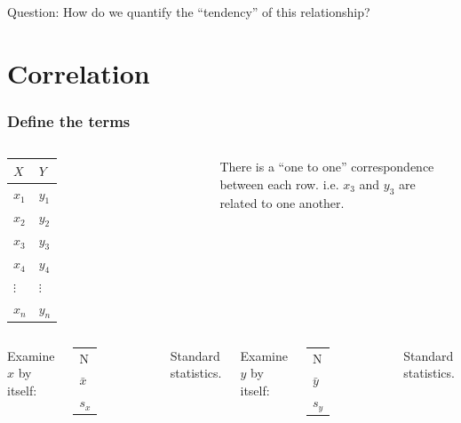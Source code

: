 \begin{frame}
  Question: How do we quantify the ``tendency'' of this relationship?
\end{frame}


\section{Correlation}


\begin{frame}
  \frametitle{Define the terms}

  \begin{columns}

    \begin{tabular}{l|l}
      $X$ & $Y$ \\ \hline
      $x_1$ & $y_1$ \\
      $x_2$ & $y_2$ \\
      $x_3$ & $y_3$ \\
      $x_4$ & $y_4$ \\
      $\vdots$ & $\vdots$ \\
      $x_n$ & $y_n$ \\
    \end{tabular}


    \vfill


    {
      There is a ``one to one'' correspondence between each
      row. i.e. $x_3$ and $y_3$ are related to one another.

    }

    \vfill

  \end{columns}


  \begin{columns}

     {

      Examine $x$ by itself: \\
      \begin{tabular}{l}
        N \\
        $\bar{x}$ \\
        $s_x$
      \end{tabular}

      Standard statistics.

    }
      


     {

      Examine $y$ by itself: \\
      \begin{tabular}{l}
        N \\
        $\bar{y}$ \\
        $s_y$
      \end{tabular}

      Standard statistics.


    }


  \end{columns}


\end{frame}

